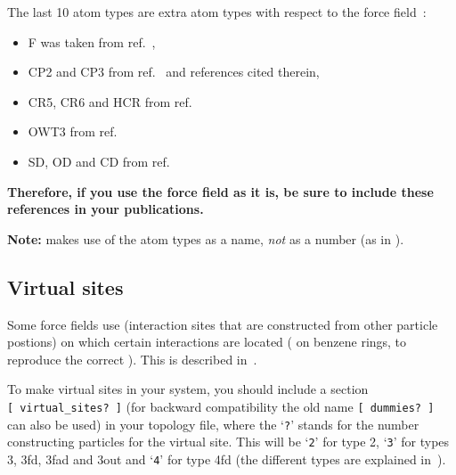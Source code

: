 The last 10 atom types are extra atom types with respect to the 
force field~\cite{biomos}: 
\begin{itemize}
\item F was taken from ref.~\cite{Buuren93a}, 
\item CP2 and CP3 from ref.~\cite{Buuren93b} and references cited therein, 
\item CR5, CR6 and HCR from ref.~\cite{Spoel96c}
\item OWT3 from ref.~\cite{Jorgensen83}
\item SD, OD and CD from ref.~\cite{Liu95}
\end{itemize}
{\bf Therefore, if you use the {\gromacs} force field as it is, be
sure to include these references in your publications.}

{\bf Note:} {\gromacs} makes use of the atom types as a name, {\em
not} as a number (as {\eg} in {\gromos}).

%
%

\subsection{Virtual sites}
\label{sec:vsitetop}
Some force fields use 
(interaction sites that are constructed from other particle postions)
on which certain interactions are located
({\eg} on benzene rings, to reproduce the correct
). This is described in~.

To make virtual sites in your system, you should include a section
{\tt [~virtual\_sites?~]} (for backward compatibility the old name
{\tt [~dummies?~]} can also be used) in your topology file,
where the `{\tt ?}' stands
for the number constructing particles for the virtual site. This will be
`{\tt 2}' for type 2, `{\tt 3}' for types 3, 3fd, 3fad and 3out and
`{\tt 4}' for type 4fd (the different types are explained
in~).

